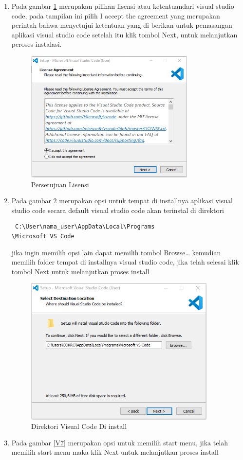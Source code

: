 \begin{enumerate}
\item Pada gambar \ref{V5} merupakan pilihan lisensi atau ketentuandari visual studio code, pada tampilan ini pilih I accept the agreement yang merupakan perintah bahwa menyetujui ketentuan yang di berikan untuk pemasangan aplikasi visual studio code setelah itu klik tombol Next, untuk melanjutkan peroses instalasi.
 \begin{figure}[!htbp]
	\centerline{\includegraphics[width=0.80\textwidth]{figures/vs/5.png}}
	\caption{Persetujuan Lisensi}
	\label{V5}
\end{figure}

\item Pada gambar \ref{V6}  merupakan opsi untuk tempat di installnya aplikasi visual studio code secara default visual studio code akan terinstal di direktori 
\begin{verbatim} C:\User\nama_user\AppData\Local\Programs
\Microsoft VS Code 
\end{verbatim}
 jika ingin memilih opsi lain dapat memilih tombol Browse… kemudian memilih folder tempat di installnya visual studio code, jika telah selesai klik tombol Next untuk melanjutkan proses install
\begin{figure}[!htbp]
	\centerline{\includegraphics[width=0.90\textwidth]{figures/vs/6.png}}
	\caption{Direktori Visual Code Di install}
	\label{V6}
\end{figure}
 \pagebreak
\item Pada gambar \ref{V7} merupakan opsi untuk memilih start menu, jika telah memilih start menu maka klik Next untuk melanjutkan proses install


\end{enumerate}
